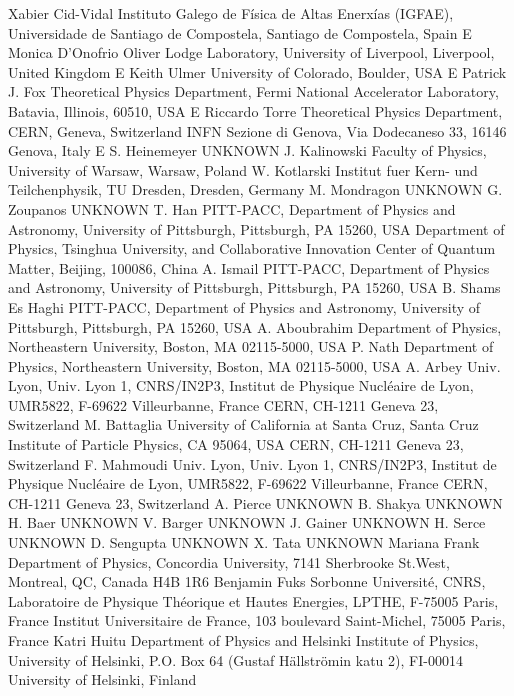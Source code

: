 Xabier Cid-Vidal {Instituto Galego de F\'isica de Altas Enerx\'ias (IGFAE), Universidade de Santiago de Compostela, Santiago de Compostela, Spain} E
Monica D'Onofrio {Oliver Lodge Laboratory, University of Liverpool, Liverpool, United Kingdom} E
Keith Ulmer {University of Colorado, Boulder, USA} E
Patrick J. Fox {Theoretical Physics Department, Fermi National Accelerator Laboratory, Batavia, Illinois, 60510, USA} E
Riccardo Torre {Theoretical Physics Department, CERN, Geneva, Switzerland} {INFN Sezione di Genova, Via Dodecaneso 33, 16146 Genova, Italy} E
S. Heinemeyer {UNKNOWN}
J. Kalinowski {Faculty of Physics, University of Warsaw, Warsaw, Poland}
W. Kotlarski {Institut fuer Kern- und Teilchenphysik, TU Dresden, Dresden, Germany} 
M. Mondragon {UNKNOWN}
G. Zoupanos {UNKNOWN} 
T. Han {PITT-PACC, Department of Physics and Astronomy, University of Pittsburgh, Pittsburgh, PA 15260, USA} {Department of Physics, Tsinghua University, and Collaborative Innovation Center of Quantum Matter, Beijing, 100086, China}
A. Ismail {PITT-PACC, Department of Physics and Astronomy, University of Pittsburgh, Pittsburgh, PA 15260, USA}
B. Shams Es Haghi {PITT-PACC, Department of Physics and Astronomy, University of Pittsburgh, Pittsburgh, PA 15260, USA}
A. Aboubrahim {Department of Physics, Northeastern University, Boston, MA 02115-5000, USA}
P. Nath {Department of Physics, Northeastern University, Boston, MA 02115-5000, USA}
A. Arbey {Univ. Lyon, Univ. Lyon 1, CNRS/IN2P3, Institut de Physique Nucl\'eaire de Lyon, UMR5822, F-69622 Villeurbanne, France} {CERN, CH-1211 Geneva 23, Switzerland}
M. Battaglia {University of California at Santa Cruz, Santa Cruz Institute of Particle Physics, CA 95064, USA} {CERN, CH-1211 Geneva 23, Switzerland}
F. Mahmoudi {Univ. Lyon, Univ. Lyon 1, CNRS/IN2P3, Institut de Physique Nucl\'eaire de Lyon, UMR5822, F-69622 Villeurbanne, France} {CERN, CH-1211 Geneva 23, Switzerland}
A. Pierce {UNKNOWN}
B. Shakya {UNKNOWN}
H. Baer {UNKNOWN} 
V. Barger {UNKNOWN} 
J. Gainer {UNKNOWN} 
H. Serce {UNKNOWN}
D. Sengupta {UNKNOWN} 
X. Tata {UNKNOWN}
Mariana Frank {Department of Physics, Concordia University, 7141 Sherbrooke St.West, Montreal, QC, Canada H4B 1R6}
Benjamin Fuks {Sorbonne Universit\'e, CNRS, Laboratoire de Physique Th\'eorique et Hautes Energies, LPTHE, F-75005 Paris, France} {Institut Universitaire de France, 103 boulevard Saint-Michel, 75005 Paris, France}
Katri Huitu {Department of Physics and Helsinki Institute of Physics, University of Helsinki, P.O. Box 64 (Gustaf H\"allstr\"omin katu 2), FI-00014 University of Helsinki, Finland}

